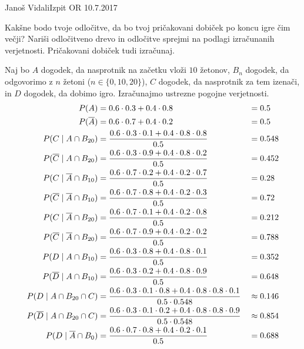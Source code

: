 \begin{naloga}{Janoš Vidali}{Izpit OR 10.7.2017}
\begin{vprasanje}
Kakšne bodo tvoje odločitve,
da bo tvoj pričakovani dobiček po koncu igre čim večji?
Nariši odločitveno drevo
in odločitve sprejmi na podlagi izračunanih verjetnosti.
Pričakovani dobiček tudi izračunaj.
\end{vprasanje}

\begin{odgovor}
Naj bo $A$ dogodek, da nasprotnik na začetku vloži $10$ žetonov,
$B_n$ dogodek, da odgovorimo z $n$ žetoni ($n \in \{0, 10, 20\}$),
$C$ dogodek, da nasprotnik za tem izenači,
in $D$ dogodek, da dobimo igro.
Izračunajmo ustrezne pogojne verjetnosti.
\begin{alignat*}{2}
P(A) &= 0.6 \cdot 0.3 + 0.4 \cdot 0.8 &&= 0.5 \\
P(\overline{A}) &= 0.6 \cdot 0.7 + 0.4 \cdot 0.2 &&= 0.5 \\
P(C \;|\; A \cap B_{20})
&= {0.6 \cdot 0.3 \cdot 0.1 + 0.4 \cdot 0.8 \cdot 0.8 \over 0.5} &&= 0.548 \\
P(\overline{C} \;|\; A \cap B_{20})
&= {0.6 \cdot 0.3 \cdot 0.9 + 0.4 \cdot 0.8 \cdot 0.2 \over 0.5} &&= 0.452 \\
P(C \;|\; \overline{A} \cap B_{10})
&= {0.6 \cdot 0.7 \cdot 0.2 + 0.4 \cdot 0.2 \cdot 0.7 \over 0.5} &&= 0.28 \\
P(\overline{C} \;|\; \overline{A} \cap B_{10})
&= {0.6 \cdot 0.7 \cdot 0.8 + 0.4 \cdot 0.2 \cdot 0.3 \over 0.5} &&= 0.72 \\
P(C \;|\; \overline{A} \cap B_{20})
&= {0.6 \cdot 0.7 \cdot 0.1 + 0.4 \cdot 0.2 \cdot 0.8 \over 0.5} &&= 0.212 \\
P(\overline{C} \;|\; \overline{A} \cap B_{20})
&= {0.6 \cdot 0.7 \cdot 0.9 + 0.4 \cdot 0.2 \cdot 0.2 \over 0.5} &&= 0.788 \\
P(D \;|\; A \cap B_{10})
&= {0.6 \cdot 0.3 \cdot 0.8 + 0.4 \cdot 0.8 \cdot 0.1 \over 0.5} &&= 0.352 \\
P(\overline{D} \;|\; A \cap B_{10})
&= {0.6 \cdot 0.3 \cdot 0.2 + 0.4 \cdot 0.8 \cdot 0.9 \over 0.5} &&= 0.648 \\
P(D \;|\; A \cap B_{20} \cap C)
&= {0.6 \cdot 0.3 \cdot 0.1 \cdot 0.8 + 0.4 \cdot 0.8 \cdot 0.8 \cdot 0.1
\over 0.5 \cdot 0.548} &&\approx 0.146 \\
P(\overline{D} \;|\; A \cap B_{20} \cap C)
&= {0.6 \cdot 0.3 \cdot 0.1 \cdot 0.2 + 0.4 \cdot 0.8 \cdot 0.8 \cdot 0.9
\over 0.5 \cdot 0.548} &&\approx 0.854 \\
P(D \;|\; \overline{A} \cap B_0)
&= {0.6 \cdot 0.7 \cdot 0.8 + 0.4 \cdot 0.2 \cdot 0.1 \over 0.5} &&= 0.688 \\

\end{alignat*}
\end{odgovor}
\end{naloga}
